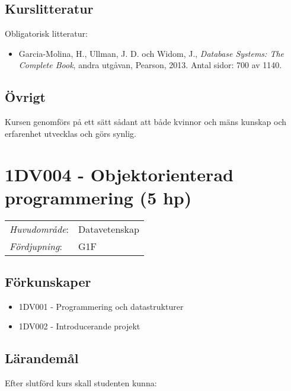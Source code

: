 \subsection*{Kurslitteratur}

Obligatorisk litteratur:

\begin{itemize}
\tightlist
\item
  Garcia-Molina, H., Ullman, J. D. och Widom, J., \emph{Database
  Systems: The Complete Book}, andra utgåvan, Pearson, 2013. Antal
  sidor: 700 av 1140.
\end{itemize}

\subsection*{Övrigt}

Kursen genomförs på ett sätt sådant att både kvinnor och mäns kunskap och erfarenhet utvecklas och görs synlig.
\pagebreak
\section*{1DV004 - Objektorienterad programmering (5 hp)}

\begin{tabular}{ll}\emph{Huvudområde}: & Datavetenskap\tabularnewline\emph{Fördjupning}: & G1F\tabularnewline\end{tabular}

\subsection*{Förkunskaper}

\begin{itemize}
\tightlist
\item
  1DV001 - Programmering och datastrukturer
\item
  1DV002 - Introducerande projekt
\end{itemize}

\subsection*{Lärandemål}

Efter slutförd kurs skall studenten kunna:

